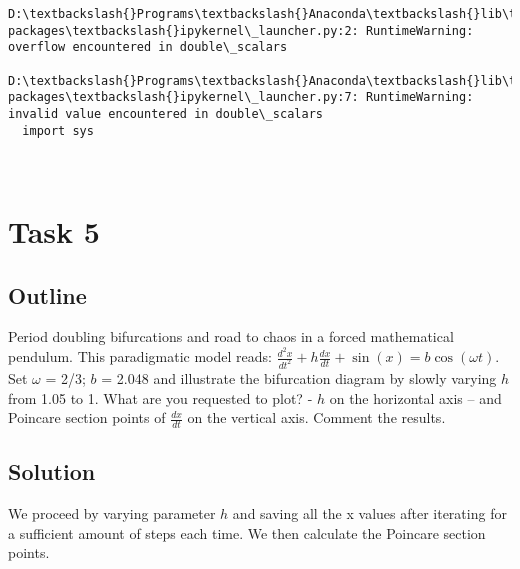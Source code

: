 \documentclass[11pt]{article}
\begin{document}
    \begin{Verbatim}[commandchars=\\\{\}]
D:\textbackslash{}Programs\textbackslash{}Anaconda\textbackslash{}lib\textbackslash{}site-packages\textbackslash{}ipykernel\_launcher.py:2: RuntimeWarning: overflow encountered in double\_scalars
  
D:\textbackslash{}Programs\textbackslash{}Anaconda\textbackslash{}lib\textbackslash{}site-packages\textbackslash{}ipykernel\_launcher.py:7: RuntimeWarning: invalid value encountered in double\_scalars
  import sys

    \end{Verbatim}

    \begin{center}
    \end{center}
    { \hspace*{\fill} \\}
    
    \hypertarget{task-5}{%
\section{Task 5}\label{task-5}}

\hypertarget{outline}{%
\subsection{Outline}\label{outline}}

Period doubling bifurcations and road to chaos in a forced mathematical
pendulum. This paradigmatic model reads:
\(\frac{d^2 x}{dt^2} + h \frac{dx}{dt} + \sin(x) = b\cos(\omega t)\).
Set \(\omega\) = 2/3; \(b\) = 2.048 and illustrate the bifurcation
diagram by slowly varying \(h\) from 1.05 to 1. What are you requested
to plot? - \(h\) on the horizontal axis -- and Poincare section points
of \(\frac{dx}{dt}\) on the vertical axis. Comment the results.

    \hypertarget{solution}{%
\subsection{Solution}\label{solution}}

We proceed by varying parameter \(h\) and saving all the x values after
iterating for a sufficient amount of steps each time. We then calculate
the Poincare section points.
\end{document}
